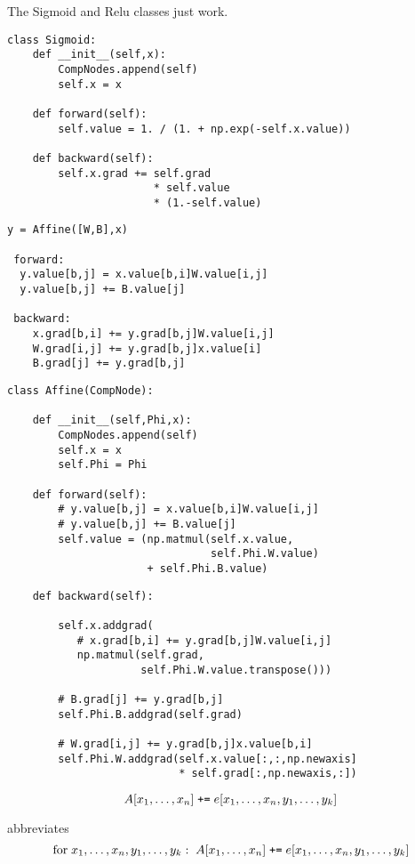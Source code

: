 {The Sigmoid and Relu classes just work.

\begin{verbatim}
class Sigmoid:
    def __init__(self,x):
        CompNodes.append(self)
        self.x = x

    def forward(self):
        self.value = 1. / (1. + np.exp(-self.x.value))

    def backward(self):
        self.x.grad += self.grad
                       * self.value
                       * (1.-self.value)
\end{verbatim}


\vfill
\eject
\begin{verbatim}
y = Affine([W,B],x)

 forward:
  y.value[b,j] = x.value[b,i]W.value[i,j]
  y.value[b,j] += B.value[j]

 backward:
    x.grad[b,i] += y.grad[b,j]W.value[i,j]
    W.grad[i,j] += y.grad[b,j]x.value[i]
    B.grad[j] += y.grad[b,j]
\end{verbatim}

\vfill
\eject
\begin{verbatim}
class Affine(CompNode):

    def __init__(self,Phi,x):
        CompNodes.append(self)
        self.x = x
        self.Phi = Phi

    def forward(self):
        # y.value[b,j] = x.value[b,i]W.value[i,j]
        # y.value[b,j] += B.value[j]
        self.value = (np.matmul(self.x.value,
                                self.Phi.W.value)
                      + self.Phi.B.value)
\end{verbatim}
\vfill
\eject
\vfill
\begin{verbatim}
    def backward(self):

        self.x.addgrad(
           # x.grad[b,i] += y.grad[b,j]W.value[i,j]
           np.matmul(self.grad,
                     self.Phi.W.value.transpose()))

        # B.grad[j] += y.grad[b,j]
        self.Phi.B.addgrad(self.grad)

        # W.grad[i,j] += y.grad[b,j]x.value[b,i]
        self.Phi.W.addgrad(self.x.value[:,:,np.newaxis]
                           * self.grad[:,np.newaxis,:])
\end{verbatim}



$$A[x_1,\ldots,x_n] \; \mbox{\tt +=}\; e[x_1,\ldots,x_n,y_1,\ldots,y_k]$$

abbreviates
$$\mbox{for}\;x_1,\ldots,x_n,y_1,\ldots,y_k:\; A[x_1,\ldots,x_n]\;\mbox{\tt +=}\; e[x_1,\ldots,x_n,y_1,\ldots,y_k]$$

}
